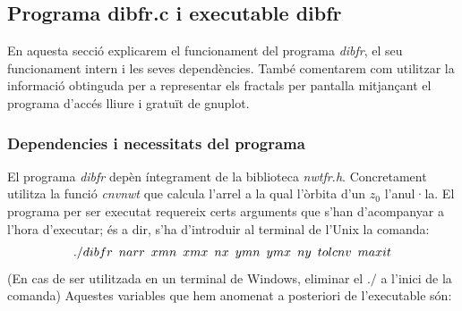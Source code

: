 \documentclass[12pt]{report}
\begin{document}
\subsection{Programa dibfr.c i executable dibfr}
En aquesta secció explicarem el funcionament del programa \textit{dibfr}, el seu funcionament intern i les seves dependències.
\newline
També comentarem com utilitzar la informació obtinguda per a representar els fractals per pantalla mitjançant el programa d'accés lliure i gratuït de gnuplot.


\subsubsection{Dependencies i necessitats del programa}
El programa \textit{dibfr} depèn íntegrament de la biblioteca \textit{nwtfr.h}. Concretament utilitza la funció \textit{cnvnwt} que calcula l'arrel a la qual l'òrbita d'un $z_0$ l'anul·la.
\newline
El programa per ser executat requereix certs arguments que s'han d'acompanyar a l'hora d'executar; és a dir, s'ha d'introduir al terminal de l'Unix la comanda:
$$./dibfr \hspace{0.5em} narr \hspace{0.5em} xmn \hspace{0.5em} xmx \hspace{0.5em} nx\hspace{0.5em}  ymn \hspace{0.5em} ymx \hspace{0.5em} ny \hspace{0.5em} tolcnv \hspace{0.5em} maxit$$
(En cas de ser utilitzada en un terminal de Windows, eliminar el $./$ a l'inici de la comanda)
\newline
Aquestes variables que hem anomenat a posteriori de l'executable són:
\end{document}
